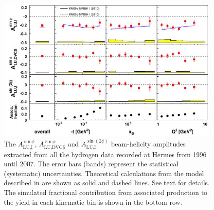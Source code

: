 \begin{figure}
 \begin{center}
 \includegraphics[width=15cm]{bsadvcsplots_eml_par13_bin6_release_all_pic_update}
  \caption{The $A_{\textrm{LU,I}}^{\sin\phi}$, $A_{\textrm{LU,DVCS}}^{\sin\phi}$ and
$A_{\textrm{LU,I}}^{\sin(2\phi)}$ beam-helicity  amplitudes extracted from all the hydrogen data recorded at H{\sc ermes}
from 1996 until 2007. The error bars (bands) represent the statistical
(systematic) uncertainties.  Theoretical calculations from the model described in \cite{Kum09} are shown as solid and dashed lines. See text for details. The simulated fractional contribution from associated production to the yield in each kinematic bin is shown in the bottom row.}
  \label{bsa_xbjrange}
 \end{center}
\end{figure}

